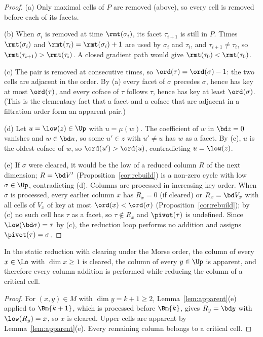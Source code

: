 \begin{proof}
(a) Only maximal cells of $P$ are removed (above), so every cell is removed
before each of its facets.

(b) When $\sigma_i$ is removed at time $\rmt(\sigma_i)$, its facet $\tau_{i+1}$ is
still in $P$. Times $\rmt(\sigma_i)$ and $\rmt(\tau_i)=\rmt(\sigma_i)+1$ are
used by $\sigma_i$ and $\tau_i$, and $\tau_{i+1}\ne\tau_i$, so
$\rmt(\tau_{i+1})>\rmt(\tau_i)$. A closed gradient path would give
$\rmt(\tau_0)<\rmt(\tau_0)$.

(c) The pair is removed at consecutive times, so $\ord(\tau)=\ord(\sigma)-1$:
the two cells are adjacent in the order. By (a) every facet of $\sigma$ precedes
$\sigma$, hence has key at most $\ord(\tau)$, and every coface of $\tau$ follows
$\tau$, hence has key at least $\ord(\sigma)$. (This is the elementary fact that
a facet and a coface that are adjacent in a filtration order form an apparent
pair.)

(d) Let $u=\low(z)\in\Up$ with $u=\mu(w)$. The coefficient of $w$ in $\bd z=0$
vanishes and $w\in\bd u$, so some $u'\in z$ with $u'\ne u$ has $w$ as a facet.
By (c), $u$ is the oldest coface of $w$, so $\ord(u')>\ord(u)$, contradicting
$u=\low(z)$.

(e) If $\sigma$ were cleared, it would be the low of a reduced column $R$ of the
next dimension; $R=\bd V'$ (Proposition~\ref{cor:rebuild}) is a non-zero cycle with
low $\sigma\in\Up$, contradicting (d). Columns are processed in increasing key
order. When $\sigma$ is processed, every earlier column $x$ has $R_x=0$ (if
cleared) or $R_x=\bd V_x$ with all cells of $V_x$ of key at most
$\ord(x)<\ord(\sigma)$ (Proposition~\ref{cor:rebuild}); by (c) no such cell has
$\tau$ as a facet, so $\tau\notin R_x$ and $\pivot(\tau)$ is undefined. Since
$\low(\bd\sigma)=\tau$ by (c), the reduction loop performs no addition and
assigns $\pivot(\tau)=\sigma$.
\end{proof}

\begin{corollary}\label{cor:critical-work}
In the static reduction with clearing under the Morse order, the column of every
$x\in\Lo$ with $\dim x\ge1$ is cleared, the column of every $y\in\Up$ is
apparent, and therefore every column addition is performed while reducing the
column of a critical cell.
\end{corollary}

\begin{proof}
For $(x,y)\in M$ with $\dim y=k+1\ge2$, Lemma~\ref{lem:apparent}(e) applied to
$\Bm{k+1}$, which is processed before $\Bm{k}$, gives $R_y=\bd y$ with
$\low(R_y)=x$, so $x$ is cleared. Upper cells are apparent by
Lemma~\ref{lem:apparent}(e). Every remaining column belongs to a critical cell.
\end{proof}

